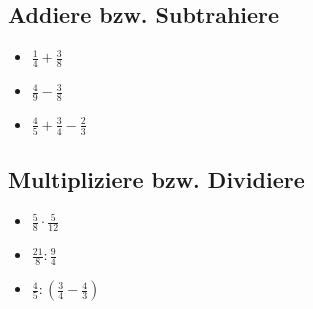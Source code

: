 \documentclass[12pt, arial]{article}
\begin{document}
        	\subsection{Addiere bzw. Subtrahiere}
         		\begin{itemize}
         			\item[] $\frac{1}{4} + \frac{3}{8}$
         			\item[] $\frac{4}{9} - \frac{3}{8}$
         			\item[] $\frac{4}{5} + \frac{3}{4} - \frac{2}{3}$
         		\end{itemize}
         	\subsection{Multipliziere bzw. Dividiere}
         		\begin{itemize}
         			\item[] $\frac{5}{8} \cdot \frac{5}{12}$
         			\item[] $\frac{21}{8} : \frac{9}{4}$
         			\item[] $\frac{4}{5} : (\frac{3}{4} - \frac{4}{3})$
         		\end{itemize}
\end{document}
